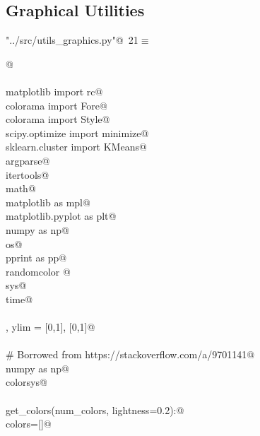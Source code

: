 \documentclass[12.0pt]{report}
\begin{document}
\begin{appendices}
\section{Graphical Utilities}


\begin{flushleft} \small\label{scrap9}\raggedright\small
{} \verb@"../src/utils_graphics.py"@\nobreak\ {\footnotesize {21}}$\equiv$
\vspace{-1ex}
\begin{list}{}{} \item
\mbox{}\verb@    @\\
\mbox{}\verb@@\\
\mbox{}\verb@from matplotlib import rc@\\
\mbox{}\verb@from colorama import Fore@\\
\mbox{}\verb@from colorama import Style@\\
\mbox{}\verb@from scipy.optimize import minimize@\\
\mbox{}\verb@from sklearn.cluster import KMeans@\\
\mbox{}\verb@import argparse@\\
\mbox{}\verb@import itertools@\\
\mbox{}\verb@import math@\\
\mbox{}\verb@import matplotlib as mpl@\\
\mbox{}\verb@import matplotlib.pyplot as plt@\\
\mbox{}\verb@import numpy as np@\\
\mbox{}\verb@import os@\\
\mbox{}\verb@import pprint as pp@\\
\mbox{}\verb@import randomcolor @\\
\mbox{}\verb@import sys@\\
\mbox{}\verb@import time@\\
\mbox{}\verb@@\\
\mbox{}\verb@xlim, ylim = [0,1], [0,1]@\\
\mbox{}\verb@@\\
\mbox{}\verb@# Borrowed from https://stackoverflow.com/a/9701141@\\
\mbox{}\verb@import numpy as np@\\
\mbox{}\verb@import colorsys@\\
\mbox{}\verb@@\\
\mbox{}\verb@def get_colors(num_colors, lightness=0.2):@\\
\mbox{}\verb@    colors=[]@\\

\end{list}
\end{flushleft}
\end{appendices}
\end{document}
